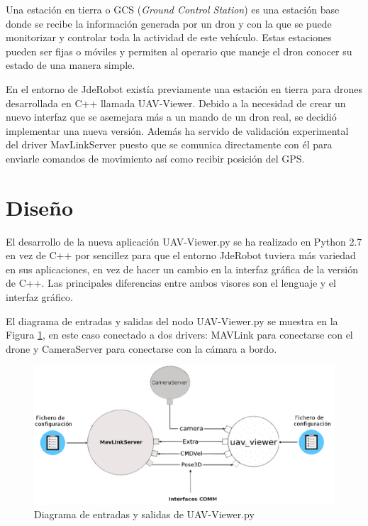 \label{visor uavViewer}

Una estación en tierra o GCS (\textit{Ground Control Station}) es una estación base donde se recibe la
información generada por un dron y con la que se puede monitorizar y controlar toda la actividad
de este vehículo. Estas estaciones pueden ser fijas o móviles y permiten al operario que maneje el dron
conocer su estado de una manera simple.

En el entorno de JdeRobot existía previamente una estación en tierra para drones desarrollada en C++ llamada UAV-Viewer. Debido a la necesidad de crear un nuevo interfaz que se asemejara más a un mando de un dron real, se decidió implementar una nueva versión. Además ha servido de validación experimental del driver MavLinkServer puesto que se comunica directamente con él para enviarle comandos de movimiento así como recibir posición del GPS.

\section{Diseño}

El desarrollo de la nueva aplicación UAV-Viewer.py se ha realizado en Python 2.7 en vez de C++ por sencillez para que el entorno JdeRobot tuviera más variedad en sus aplicaciones, en vez de hacer un cambio en la interfaz gráfica de la versión de C++. Las principales diferencias entre ambos visores son el lenguaje y el interfaz gráfico. 

El diagrama de entradas y salidas del nodo UAV-Viewer.py se muestra en la Figura \ref{fig:esquemaUav}, en este caso
conectado a dos drivers: MAVLink para conectarse con el drone y CameraServer para conectarse con
la cámara a bordo.

\begin{figure}[H]
  \centering
  \includegraphics[scale=0.4]{imagenes/MapaGeneral.png}
  \caption{Diagrama de entradas y salidas de UAV-Viewer.py}
  \label{fig:esquemaUav}
\end{figure}

